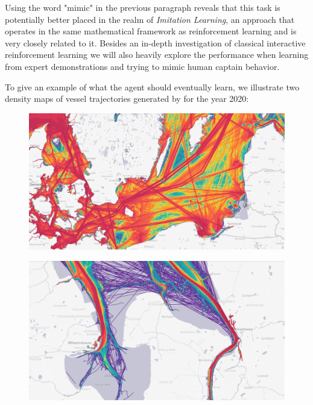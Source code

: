 \par
Using the word "mimic" in the previous paragraph reveals that this task is potentially better placed in the realm of \textit{Imitation Learning}, an approach that operates in the same mathematical framework as reinforcement learning and is very closely related to it. Besides an in-depth investigation of classical interactive reinforcement learning we will also heavily explore the performance when learning from expert demonstrations and trying to mimic human captain behavior.
\par
To give an example of what the agent should eventually learn, we illustrate two density maps of vessel trajectories generated by \cite{martinetraffic} for the year 2020:
\begin{figure}[H]
    \centering
    \begin{minipage}{.47\textwidth}
      \centering
      \includegraphics[width=\textwidth]{images/balticsea_density_routes.PNG}
      \label{fig:baltic}
    \end{minipage}
    \hspace{.05\textwidth}%
    \begin{minipage}{.47\textwidth}
        \centering
        \includegraphics[width=\textwidth]{images/bhv_jadebusen_density_routes.PNG}
        \label{fig:jadebusen}
      \end{minipage}
\end{figure}
